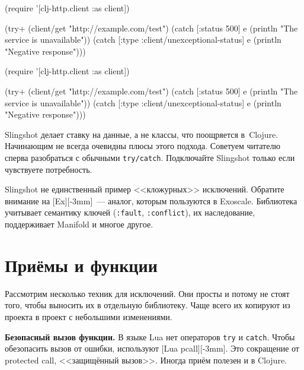 \ifx\devicetype\mobile

\begin{english}
  \begin{clojure}
(require '[clj-http.client :as client])

(try+
 (client/get "http://example.com/test")
 (catch [:status 500] e
  (println "The service is unavailable"))
 (catch
  [:type :client/unexceptional-status] e
  (println "Negative response")))
  \end{clojure}
\end{english}

\else

\begin{english}
  \begin{clojure}
(require '[clj-http.client :as client])

(try+
 (client/get "http://example.com/test")
 (catch [:status 500] e
   (println "The service is unavailable"))
 (catch [:type :client/unexceptional-status] e
   (println "Negative response")))
  \end{clojure}
\end{english}

\fi

Slingshot делает ставку на данные, а не классы, что поощряется
в~Clojure. Начинающим не всегда очевидны плюсы этого подхода. Советуем читателю
сперва разобраться с обычными \verb|try/catch|. Подключайте Slingshot только
если чувствуете потребность.


Slingshot не единственный пример <<кложурных>> исключений. Обратите внимание на
[Ex][-3mm]~--- аналог, которым пользуются в
Exoscale. Библиотека учитывает семантику ключей (\verb|:fault|,
\verb|:conflict|), их наследование, поддерживает Manifold и многое
другое.

\section{Приёмы и функции}

Рассмотрим несколько техник для исключений. Они просты и потому не стоят того,
чтобы выносить их в отдельную библиотеку. Чаще всего их копируют из проекта в
проект с небольшими изменениями.


\label{pcall}

\textbf{Безопасный вызов функции.} В языке Lua нет операторов \verb|try| и
\verb|catch|. Чтобы обезопасить вызов от ошибки, используют
[Lua pcall][-3mm]. Это сокращение от
protected call, <<защищённый вызов>>. Иногда приём полезен и в Clojure.

